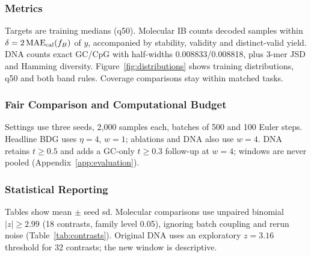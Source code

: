 \documentclass{article}
\begin{document}
\subsubsection{Metrics}
Targets are training medians (q50). Molecular IB counts decoded samples within $\delta=2\operatorname{MAE}_{\rm cal}(f_B)$ of $y$, accompanied by stability, validity and distinct-valid yield. DNA counts exact GC/CpG with half-widths 0.008833/0.008818, plus 3-mer JSD and Hamming diversity. Figure~\ref{fig:distributions} shows training distributions, q50 and both band rules. Coverage comparisons stay within matched tasks.
\subsubsection{Fair Comparison and Computational Budget}
Settings use three seeds, 2,000 samples each, batches of 500 and 100 Euler steps. Headline BDG uses $\eta=4$, $w=1$; ablations and DNA also use $w=4$. DNA retains $t\ge0.5$ and adds a GC-only $t\ge0.3$ follow-up at $w=4$; windows are never pooled (Appendix~\ref{app:evaluation}).
\subsubsection{Statistical Reporting}
Tables show mean $\pm$ seed sd. Molecular comparisons use unpaired binomial $|z|\ge2.99$ (18 contrasts, family level 0.05), ignoring batch coupling and rerun noise (Table~\ref{tab:contrasts}). Original DNA uses an exploratory $z=3.16$ threshold for 32 contrasts; the new window is descriptive.
\end{document}
